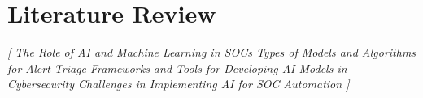 \chapter{Literature Review}
\label{chap:Chapter7}

\textit{
    [
        The Role of AI and Machine Learning in SOCs
        Types of Models and Algorithms for Alert Triage
        Frameworks and Tools for Developing AI Models in Cybersecurity
        Challenges in Implementing AI for SOC Automation
    ]
}

